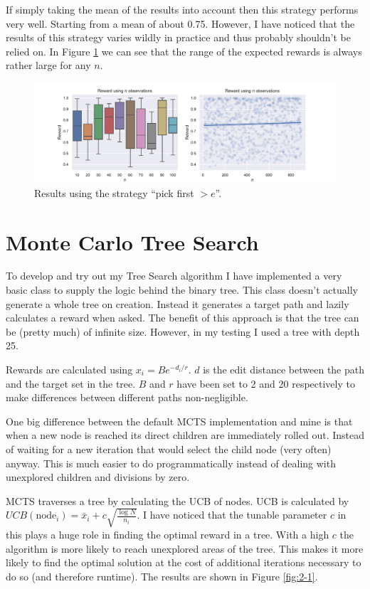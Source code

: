 \documentclass[]{scrartcl}
\begin{document}
If simply taking the mean of the results into account then this strategy performs very well. Starting from a mean of about 0.75. However, I have noticed that the results of this strategy varies wildly in practice and thus probably shouldn't be relied on. In Figure \ref{fig:1-3} we can see that the range of the expected rewards is always rather large for any $n$.

\begin{figure}[H]
	\centering
	\includegraphics[width=1\linewidth]{1-3.pdf}
	\caption{Results using the strategy ``pick first $> e$''.}
	\label{fig:1-3}
\end{figure}

\section{Monte Carlo Tree Search}

To develop and try out my Tree Search algorithm I have implemented a very basic class to supply the logic behind the binary tree. This class doesn't actually generate a whole tree on creation. Instead it generates a target path and lazily calculates a reward when asked. The benefit of this approach is that the tree can be (pretty much) of infinite size. However, in my testing I used a tree with depth 25.

Rewards are calculated using $x_i = Be^{-d_i/r}$. $d$ is the edit distance between the path and the target set in the tree. $B$ and $r$ have been set to 2 and 20 respectively to make differences between different paths non-negligible.

One big difference between the default MCTS implementation and mine is that when a new node is reached its direct children are immediately rolled out. Instead of waiting for a new iteration that would select the child node (very often) anyway. This is much easier to do programmatically instead of dealing with unexplored children and divisions by zero.

MCTS traverses a tree by calculating the UCB of nodes. UCB is calculated by $U C B(\textrm{node}_{i})=\bar{x}_{i}+c \sqrt{\frac{\log N}{n_{i}}}$. I have noticed that the tunable parameter $c$ in this plays a huge role in finding the optimal reward in a tree. With a high $c$ the algorithm is more likely to reach unexplored areas of the tree. This makes it more likely to find the optimal solution at the cost of additional iterations necessary to do so (and therefore runtime). The results are shown in Figure \ref{fig:2-1}.
\end{document}
